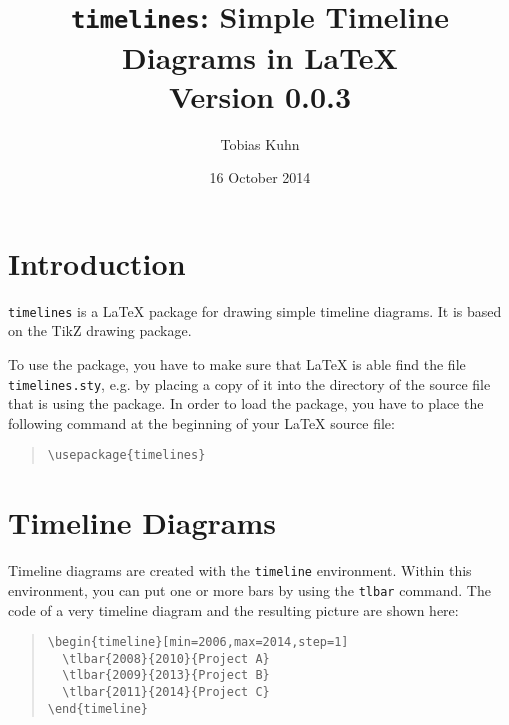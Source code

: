 \documentclass{article}
\title{
  \texttt{timelines}: Simple Timeline Diagrams in \LaTeX
  \medskip\\
  \large Version 0.0.3
}
\author{Tobias Kuhn}
\date{16 October 2014}
\begin{document}
\maketitle


\section{Introduction}

\texttt{timelines} is a {\LaTeX} package for drawing simple timeline diagrams. It is based on the TikZ drawing package.

To use the package, you have to make sure that {\LaTeX} is able find the file \texttt{timelines.sty}, e.g. by placing a copy of it into the directory of the source file that is using the package. In order to load the package, you have to place the following command at the beginning of your {\LaTeX} source file:
\begin{quote}\small
\begin{verbatim}
\usepackage{timelines}
\end{verbatim}
\end{quote}

\section{Timeline Diagrams}

Timeline diagrams are created with the \texttt{timeline} environment. Within this environment, you can put one or more bars by using the \texttt{tlbar} command. The code of a very timeline diagram and the resulting picture are shown here:
\begin{quote}\small
\begin{verbatim}
\begin{timeline}[min=2006,max=2014,step=1]
  \tlbar{2008}{2010}{Project A}
  \tlbar{2009}{2013}{Project B}
  \tlbar{2011}{2014}{Project C}
\end{timeline}
\end{verbatim}
\end{quote}
\begin{quote}
\begin{timeline}[min=2008,max=2014,step=1]
\end{timeline}
\end{quote}
\end{document}
